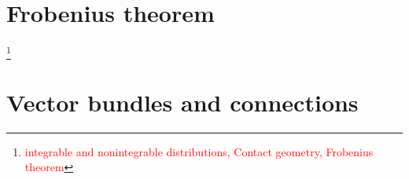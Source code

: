 \documentclass[nobib, a4paper]{tufte-book}
\theoremstyle{plain}
\theoremstyle{definition}
\theoremstyle{remark}
\newcommand{\Q}{\mathbb{Q}}
\newcommand{\R}{\mathbb{R}}
\newcommand{\todo}[1]{\footnote{\textcolor{red}{#1}}}
\begin{document}
\begin{appendices}
\chapter{Frobenius theorem}
\todo{integrable and nonintegrable distributions, Contact geometry, Frobenius theorem}
\chapter{Vector bundles and connections}
\end{appendices}

  
  

\printbibliography
{}
\end{document}

